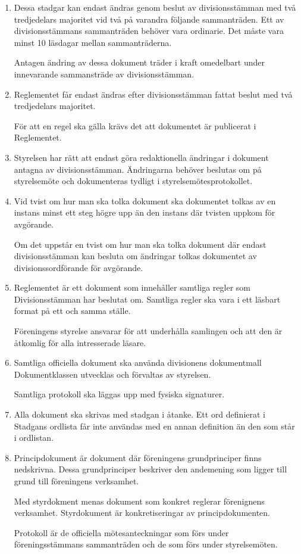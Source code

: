 \documentclass{dvd}
\begin{document}
	\begin{enumerate}[label=\arabic* §, ref=\arabic*]
		\item Dessa stadgar kan endast ändras genom beslut av divisionsstämman med två tredjedelars majoritet vid två på varandra följande sammanträden.
		Ett av divisionsstämmans sammanträden behöver vara ordinarie.
		Det måste vara minst 10 läsdagar mellan sammanträderna.

		Antagen ändring av dessa dokument träder i kraft omedelbart under innevarande sammansträde av divisionsstämman.

		\item Reglementet får endast ändras efter divisionsstämman fattat beslut med två tredjedelars majoritet.

                    För att en regel ska gälla krävs det att dokumentet är publicerat i Reglementet.

		\item Styrelsen har rätt att endast göra redaktionella ändringar i dokument antagna av divisionsstämman.
		Ändringarna behöver beslutas om på styrelsemöte och dokumenteras tydligt i styrelsemötesprotokollet.

		\item Vid tvist om hur man ska tolka dokument ska dokumentet tolkas av en instans minst ett steg högre upp än den instans där tvisten uppkom för avgörande.

		Om det uppstår en tvist om hur man ska tolka dokument där endast divisionsstämman kan besluta om ändringar tolkas dokumentet av divisionssordförande för avgörande.

		\item Reglementet är ett dokument som innehåller samtliga regler som Divisionsstämman har beslutat om. Samtliga regler ska vara i ett läsbart format på ett och samma ställe.

		Föreningens styrelse ansvarar för att underhålla samlingen och att den är åtkomlig för alla intresserade läsare.
		
		\item Samtliga officiella dokument ska använda divisionens dokumentmall
		Dokumentklassen utvecklas och förvaltas av styrelsen.

		Samtliga protokoll ska läggas upp med fysiska signaturer.
		
		\item Alla dokument ska skrivas med stadgan i åtanke.
		Ett ord definierat i Stadgans ordlista får inte användas med en annan definition än den som står i ordlistan.

		\item Principdokument är dokument där föreningens grundprinciper finns nedskrivna.
		Dessa grundprinciper beskriver den andemening som ligger till grund till föreningens verksamhet.

		Med styrdokment menas dokument som konkret reglerar förenignens verksamhet.
		Styrdokument är konkretiseringar av principdokumenten.

		Protokoll är de officiella mötesanteckningar som förs under föreningsstämmans sammanträden och de som förs under styrelsemöten.


	\end{enumerate}
\end{document}
